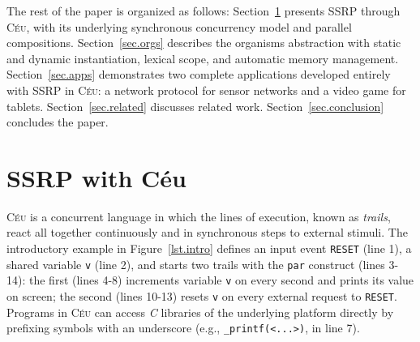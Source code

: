 \documentclass[preprint]{sigplanconf}
\newcommand{\CEU}{\textsc{C\'{e}u}\xspace}
\newcommand{\code}[1] {{\small{\texttt{#1}}}}
\newcommand{\1}{\;}
\newcommand{\2}{\;\;}
\newcommand{\3}{\;\;\;}
\newcommand{\5}{\;\;\;\;\;}
\begin{document}

The rest of the paper is organized as follows:
Section~\ref{sec.ceu} presents SSRP through \CEU, with its underlying 
synchronous concurrency model and parallel compositions.
Section~\ref{sec.orgs} describes the organisms abstraction with static and 
dynamic instantiation, lexical scope, and automatic memory management.
Section~\ref{sec.apps} demonstrates two complete applications developed 
entirely with SSRP in \CEU: a network protocol for sensor networks and a video 
game for tablets.
Section~\ref{sec.related} discusses related work.
Section~\ref{sec.conclusion} concludes the paper.

\section{SSRP with C\'eu}
\label{sec.ceu}

\CEU is a concurrent language in which the lines of execution, known as 
\emph{trails}, react all together continuously and in synchronous steps to 
external stimuli.
%
%
The introductory example in Figure~\ref{lst.intro} defines an input event 
\code{RESET} (line 1), a shared variable \code{v} (line 2), and starts two 
trails with the \code{par} construct (lines 3-14): the first (lines 4-8) 
increments variable \code{v} on every second and prints its value on screen; 
the second (lines 10-13) resets \code{v} on every external request to 
\code{RESET}.
%
%
Programs in \CEU can access \emph{C} libraries of the underlying platform 
directly by prefixing symbols with an underscore (e.g., \code{\_printf(<...>)}, 
in line 7).
\end{document}

